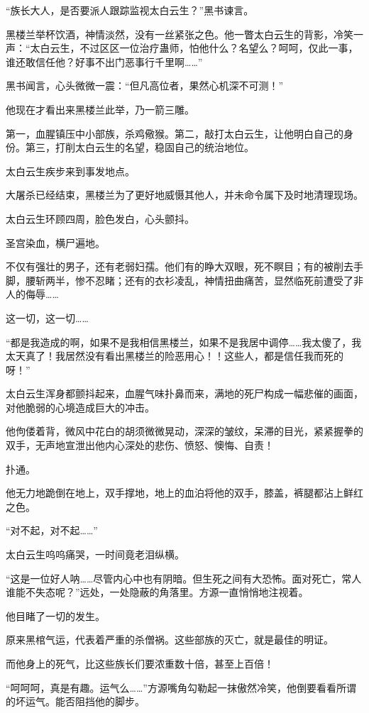 \begin{this_body}
“族长大人，是否要派人跟踪监视太白云生？”黑书谏言。

黑楼兰举杯饮酒，神情淡然，没有一丝紧张之色。他一瞥太白云生的背影，冷笑一声：“太白云生，不过区区一位治疗蛊师，怕他什么？名望么？呵呵，仅此一事，谁还敢信任他？好事不出门恶事行千里啊……”

黑书闻言，心头微微一震：“但凡高位者，果然心机深不可测！”

他现在才看出来黑楼兰此举，乃一箭三雕。

第一，血腥镇压中小部族，杀鸡儆猴。第二，敲打太白云生，让他明白自己的身份。第三，打削太白云生的名望，稳固自己的统治地位。

太白云生疾步来到事发地点。

大屠杀已经结束，黑楼兰为了更好地威慑其他人，并未命令属下及时地清理现场。

太白云生环顾四周，脸色发白，心头颤抖。

圣宫染血，横尸遍地。

不仅有强壮的男子，还有老弱妇孺。他们有的睁大双眼，死不瞑目；有的被削去手脚，腰斩两半，惨不忍睹；还有的衣衫凌乱，神情扭曲痛苦，显然临死前遭受了非人的侮辱……

这一切，这一切……

“都是我造成的啊，如果不是我相信黑楼兰，如果不是我居中调停……我太傻了，我太天真了！我居然没有看出黑楼兰的险恶用心！！这些人，都是信任我而死的呀！”

太白云生浑身都颤抖起来，血腥气味扑鼻而来，满地的死尸构成一幅悲催的画面，对他脆弱的心境造成巨大的冲击。

他佝偻着背，微风中花白的胡须微微晃动，深深的皱纹，呆滞的目光，紧紧握拳的双手，无声地宣泄出他内心深处的悲伤、愤怒、懊悔、自责！

扑通。

他无力地跪倒在地上，双手撑地，地上的血泊将他的双手，膝盖，裤腿都沾上鲜红之色。

“对不起，对不起……”

太白云生呜呜痛哭，一时间竟老泪纵横。

“这是一位好人呐……尽管内心中也有阴暗。但生死之间有大恐怖。面对死亡，常人谁能不失态呢？”远处，一处隐蔽的角落里。方源一直悄悄地注视着。

他目睹了一切的发生。

原来黑棺气运，代表着严重的杀僧祸。这些部族的灭亡，就是最佳的明证。

而他身上的死气，比这些族长们要浓重数十倍，甚至上百倍！

“呵呵呵，真是有趣。运气么……”方源嘴角勾勒起一抹傲然冷笑，他倒要看看所谓的坏运气。能否阻挡他的脚步。


\end{this_body}
